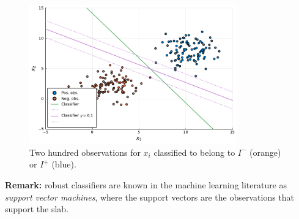 \begin{figure}[H]
    \includegraphics[width=0.8\textwidth]{figures/part_2_chapter_1/classes_with_robust_classifier.pdf}
    \caption{Two hundred observations for $x_i$ classified to belong to $I^-$ (orange) or $I^+$ (blue).}        
    \label{fig:observations_with_rob_classifier}
\end{figure}


{\bf Remark:} robust classifiers are known in the machine learning literature as \emph{support vector machines}, where the support vectors are the observations that support the slab. 
